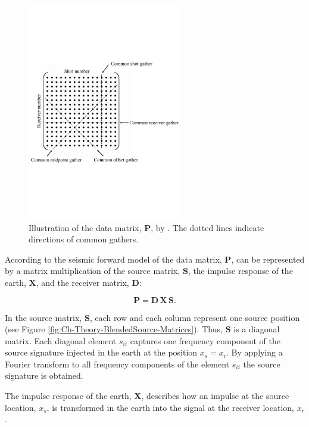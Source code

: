 \begin{figure}
    \centering
	\includegraphics[width = 0.6\textwidth]{Plots/Mahdad-Data-Matrix-edited}
	\caption{Illustration of the data matrix, $\mathbf{P}$, by \cite{Mahdad-Deblending-Method}. The dotted lines indicate directions of common gathers.}
	\label{fig:Ch-Theory-DataMatrixMahdad}
\end{figure}

According to the seismic forward model of \citet{Berkhout1982} the data matrix, $\mathbf{P}$, can be represented by a matrix multiplication of the source matrix, $\mathbf{S}$, the impulse response of the earth, $\mathbf{X}$, and the receiver matrix, $\mathbf{D}$:

\begin{equation}
	\mathbf{P} = \mathbf{D \, X \, S}.
	\label{eq:Ch-Theory-DataRepresentation}
\end{equation}

In the source matrix, $\mathbf{S}$, each row and each column represent one source position (see Figure \ref{fig:Ch-Theory-BlendedSource-Matrices}). Thus, $\mathbf{S}$ is a diagonal matrix. Each diagonal element $s_{ii}$ captures one frequency component of the source signature injected in the earth at the position $x_s = x_i$. By applying a Fourier transform to all frequency components of the element $s_{ii}$ the source signature is obtained.

 The impulse response of the earth, $\mathbf{X}$, describes how an impulse at the source location, $x_s$, is transformed in the earth into the signal at the receiver location, $x_r$.


